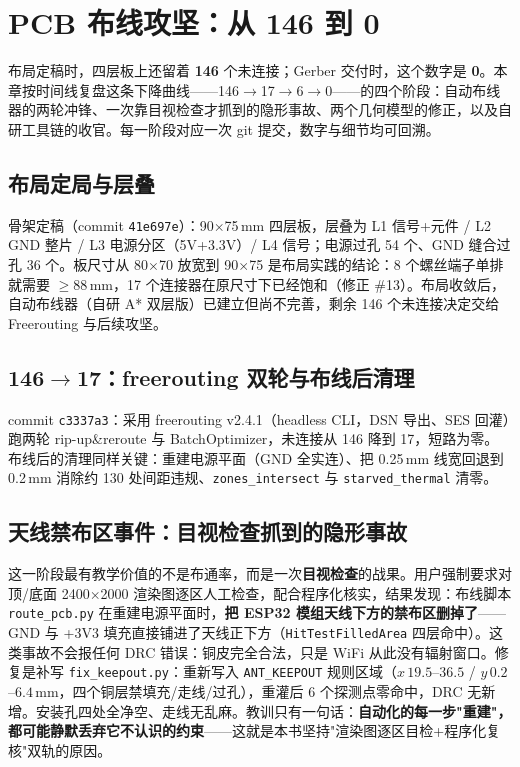\chapter{PCB 布线攻坚：从 146 到 0}
\label{ch:pcb}

布局定稿时，四层板上还留着 \textbf{146} 个未连接；Gerber 交付时，这个数字是 \textbf{0}。本章按时间线复盘这条下降曲线——146$\to$17$\to$6$\to$0——的四个阶段：自动布线器的两轮冲锋、一次靠目视检查才抓到的隐形事故、两个几何模型的修正，以及自研工具链的收官。每一阶段对应一次 git 提交，数字与细节均可回溯。

\section{布局定局与层叠}
\label{sec:pcb-layout}

骨架定稿（commit \texttt{41e697e}）：90$\times$75\,mm 四层板，层叠为 L1 信号+元件 / L2 GND 整片 / L3 电源分区（5V+3.3V）/ L4 信号；电源过孔 54 个、GND 缝合过孔 36 个。板尺寸从 80$\times$70 放宽到 90$\times$75 是布局实践的结论：8 个螺丝端子单排就需要 $\ge$88\,mm，17 个连接器在原尺寸下已经饱和（修正 \#13）。布局收敛后，自动布线器（自研 A* 双层版）已建立但尚不完善，剩余 146 个未连接决定交给 Freerouting 与后续攻坚。

\section{146$\to$17：freerouting 双轮与布线后清理}
\label{sec:pcb-freerouting}

commit \texttt{c3337a3}：采用 freerouting v2.4.1（headless CLI，DSN 导出、SES 回灌）跑两轮 rip-up\&reroute 与 BatchOptimizer，未连接从 146 降到 17，短路为零。布线后的清理同样关键：重建电源平面（GND 全实连）、把 0.25\,mm 线宽回退到 0.2\,mm 消除约 130 处间距违规、\texttt{zones\_intersect} 与 \texttt{starved\_thermal} 清零。

\section{天线禁布区事件：目视检查抓到的隐形事故}
\label{sec:pcb-keepout}

这一阶段最有教学价值的不是布通率，而是一次\textbf{目视检查}的战果。用户强制要求对顶/底面 2400$\times$2000 渲染图逐区人工检查，配合程序化核实，结果发现：布线脚本 \texttt{route\_pcb.py} 在重建电源平面时，\textbf{把 ESP32 模组天线下方的禁布区删掉了}——GND 与 +3V3 填充直接铺进了天线正下方（\texttt{HitTestFilledArea} 四层命中）。这类事故不会报任何 DRC 错误：铜皮完全合法，只是 WiFi 从此没有辐射窗口。修复是补写 \texttt{fix\_keepout.py}：重新写入 \texttt{ANT\_KEEPOUT} 规则区域（$x\,19.5$--$36.5$ / $y\,0.2$--$6.4$\,mm，四个铜层禁填充/走线/过孔），重灌后 6 个探测点零命中，DRC 无新增。安装孔四处全净空、走线无乱麻。教训只有一句话：\textbf{自动化的每一步"重建"，都可能静默丢弃它不认识的约束}——这就是本书坚持"渲染图逐区目检+程序化复核"双轨的原因。

